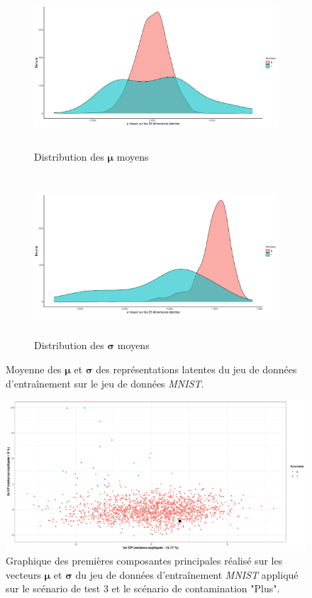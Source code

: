 \begin{figure}[H]
	\centering
	\begin{subfigure}{12cm}
		\centering\includegraphics[width=12cm, height=6cm]{images/latent_stats/plot_mu_mnist}
		\caption{Distribution des $\boldsymbol{\mu}$ moyens}
	\end{subfigure}
	\begin{subfigure}{12cm}
		\centering\includegraphics[width=12cm, height=6cm]{images/latent_stats/plot_sigma_mnist}
		\caption{Distribution des $\boldsymbol{\sigma}$ moyens}
	\end{subfigure}
	\caption{Moyenne des $\boldsymbol{\mu}$ et $\boldsymbol{\sigma}$ des représentations latentes du jeu de données d'entraînement sur le jeu de données \textit{MNIST}.}
	\label{fig:mnist_latent_stats}
\end{figure}

\begin{figure}[htb]
	\centering
	\centering\includegraphics[width=\linewidth]{images/plot_pca_mnist}
	\caption{Graphique des \DIFdelbeginFL {}\DIFdelendFL \DIFaddbeginFL {}\DIFaddendFL premières composantes principales réalisé sur les vecteurs $\boldsymbol{\mu}$ et $\boldsymbol{\sigma}$ du jeu de données d'entraînement \textit{MNIST} appliqué sur le scénario de test 3 et le scénario de contamination "Plus".}
	\label{fig:pca_mnist}
\end{figure}

